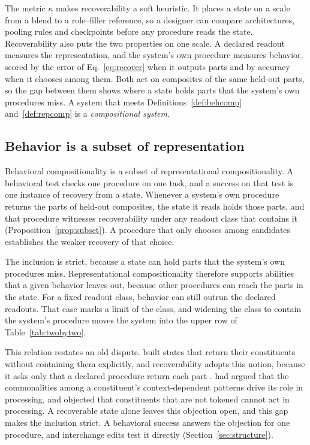 \documentclass[10pt]{article}
\theoremstyle{plain}
\theoremstyle{remark}
\begin{document}
The metric $\kappa$ makes recoverability a soft heuristic. It places a state on a scale from a blend to a role--filler reference, so a designer can compare architectures, pooling rules and checkpoints before any procedure reads the state. Recoverability also puts the two properties on one scale. A declared readout measures the representation, and the system's own procedure measures behavior, scored by the error of Eq.~\ref{eq:recover} when it outputs parts and by accuracy when it chooses among them. Both act on composites of the same held-out parts, so the gap between them shows where a state holds parts that the system's own procedures miss. A system that meets Definitions~\ref{def:behcomp} and~\ref{def:repcomp} is a \emph{compositional system}.

\subsection{Behavior is a subset of representation}
\label{sec:subset}

Behavioral compositionality is a subset of representational compositionality. A behavioral test checks one procedure on one task, and a success on that test is one instance of recovery from a state. Whenever a system's own procedure returns the parts of held-out composites, the state it reads holds those parts, and that procedure witnesses recoverability under any readout class that contains it (Proposition~\ref{prop:subset}). A procedure that only chooses among candidates establishes the weaker recovery of that choice.

The inclusion is strict, because a state can hold parts that the system's own procedures miss. Representational compositionality therefore supports abilities that a given behavior leaves out, because other procedures can reach the parts in the state. For a fixed readout class, behavior can still outrun the declared readouts. That case marks a limit of the class, and widening the class to contain the system's procedure moves the system into the upper row of Table~\ref{tab:twobytwo}.

This relation restates an old dispute. \citet{smolensky1990} built states that return their constituents without containing them explicitly, and recoverability adopts this notion, because it asks only that a declared procedure return each part \citep[cf.][]{vangelder1990}. \citet{smolensky1988} had argued that the commonalities among a constituent's context-dependent patterns drive its role in processing, and \citet{fodor1990} objected that constituents that are not tokened cannot act in processing. A recoverable state alone leaves this objection open, and this gap makes the inclusion strict. A behavioral success answers the objection for one procedure, and interchange edits test it directly (Section~\ref{sec:structure}).
\end{document}
